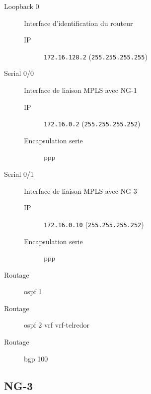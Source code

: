 	\begin{description}
		\item[Loopback 0] Interface d'identification du routeur
		\begin{description}
			\item[IP] \texttt{172.16.128.2} (\texttt{255.255.255.255})
		\end{description}

		\item[Serial 0/0] Interface de liaison MPLS avec NG-1
		\begin{description}
			\item[IP] \texttt{172.16.0.2} (\texttt{255.255.255.252})
			\item[Encapsulation serie] ppp
		\end{description}

		\item[Serial 0/1] Interface de liaison MPLS avec NG-3
		\begin{description}
			\item[IP] \texttt{172.16.0.10} (\texttt{255.255.255.252})
			\item[Encapsulation serie] ppp
		\end{description}

		\item[Routage] ospf 1
		\item[Routage] ospf 2 vrf vrf-telredor
		\item[Routage] bgp 100
	\end{description}
\subsection{NG-3}

